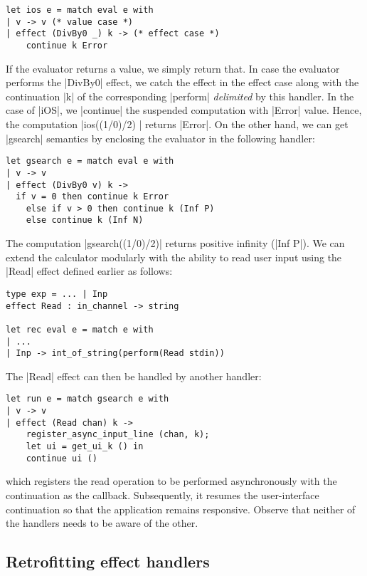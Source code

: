 \documentclass[sigplan,10pt,review,anonymous]{acmart}\settopmatter{printfolios=true,printccs=false,printacmref=false}
\begin{document}
\begin{lstlisting}
let ios e = match eval e with
| v -> v (* value case *)
| effect (DivBy0 _) k -> (* effect case *)
    continue k Error
\end{lstlisting}

If the evaluator returns a value, we simply return that. In case the evaluator
performs the |DivBy0| effect, we catch the effect in the effect case along with
the continuation |k| of the corresponding |perform| \emph{delimited} by this
handler. In the case of |iOS|, we |continue| the suspended computation with
|Error| value. Hence, the computation |ios((1/0)/2) | returns |Error|. On the
other hand, we can get |gsearch| semantics by enclosing the evaluator in the
following handler:

\begin{lstlisting}
let gsearch e = match eval e with
| v -> v
| effect (DivBy0 v) k ->
  if v = 0 then continue k Error
	else if v > 0 then continue k (Inf P)
	else continue k (Inf N)
\end{lstlisting}

The computation |gsearch((1/0)/2)| returns positive infinity (|Inf P|). We can
extend the calculator modularly with the ability to read user input using the
|Read| effect defined earlier as follows:

\begin{lstlisting}
type exp = ... | Inp
effect Read : in_channel -> string

let rec eval e = match e with
| ...
| Inp -> int_of_string(perform(Read stdin))
\end{lstlisting}

The |Read| effect can then be handled by another handler:

\begin{lstlisting}
let run e = match gsearch e with
| v -> v
| effect (Read chan) k ->
	register_async_input_line (chan, k);
	let ui = get_ui_k () in
	continue ui ()
\end{lstlisting}

\noindent which registers the read operation to be performed asynchronously
with the continuation as the callback. Subsequently, it resumes the
user-interface continuation so that the application remains responsive. Observe
that neither of the handlers needs to be aware of the other.

\subsection{Retrofitting effect handlers}
\end{document}
